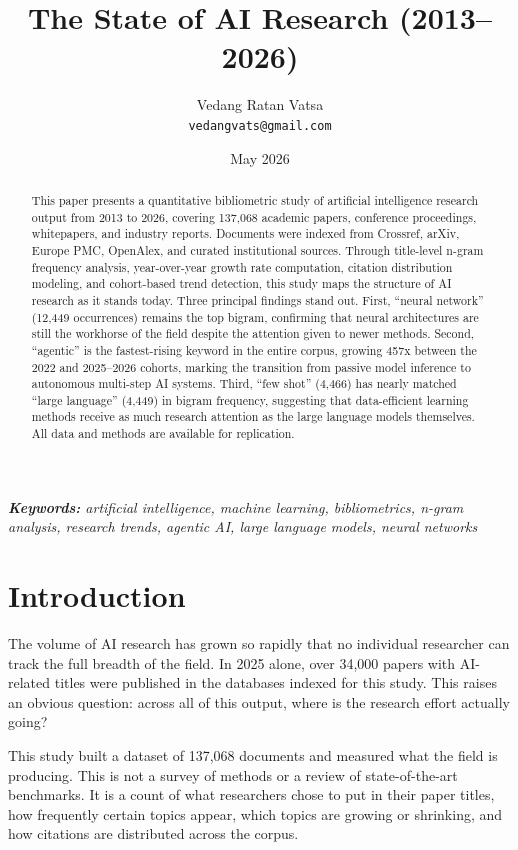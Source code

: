 \documentclass[11pt]{article}
\title{The State of AI Research (2013--2026)}
\author{
  Vedang Ratan Vatsa \\
  \texttt{vedangvats@gmail.com}
}
\date{May 2026}
\begin{document}
\maketitle

\begin{abstract}
This paper presents a quantitative bibliometric study of artificial intelligence research output from 2013 to 2026, covering 137,068 academic papers, conference proceedings, whitepapers, and industry reports. Documents were indexed from Crossref, arXiv, Europe PMC, OpenAlex, and curated institutional sources. Through title-level n-gram frequency analysis, year-over-year growth rate computation, citation distribution modeling, and cohort-based trend detection, this study maps the structure of AI research as it stands today. Three principal findings stand out. First, ``neural network'' (12,449 occurrences) remains the top bigram, confirming that neural architectures are still the workhorse of the field despite the attention given to newer methods. Second, ``agentic'' is the fastest-rising keyword in the entire corpus, growing 457x between the 2022 and 2025--2026 cohorts, marking the transition from passive model inference to autonomous multi-step AI systems. Third, ``few shot'' (4,466) has nearly matched ``large language'' (4,449) in bigram frequency, suggesting that data-efficient learning methods receive as much research attention as the large language models themselves. All data and methods are available for replication.
\end{abstract}

\noindent\textit{\textbf{Keywords:} artificial intelligence, machine learning, bibliometrics, n-gram analysis, research trends, agentic AI, large language models, neural networks}

\section{Introduction}
\label{sec:intro}

The volume of AI research has grown so rapidly that no individual researcher can track the full breadth of the field. In 2025 alone, over 34,000 papers with AI-related titles were published in the databases indexed for this study. This raises an obvious question: across all of this output, where is the research effort actually going?

This study built a dataset of 137,068 documents and measured what the field is producing. This is not a survey of methods or a review of state-of-the-art benchmarks. It is a count of what researchers chose to put in their paper titles, how frequently certain topics appear, which topics are growing or shrinking, and how citations are distributed across the corpus.
\end{document}
